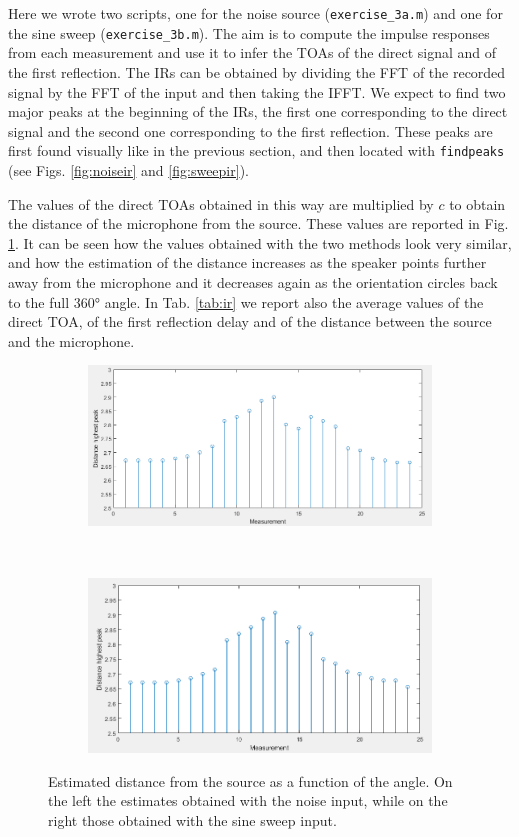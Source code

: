 \documentclass[a4paper]{article}
\begin{document}
Here we wrote two scripts, one for the noise source (\verb|exercise_3a.m|) and one for the sine sweep (\verb|exercise_3b.m|). The aim is to compute the impulse responses from each measurement and use it to infer the TOAs of the direct signal and of the first reflection. The IRs can be obtained by dividing the FFT of the recorded signal by the FFT of the input and then taking the IFFT. We expect to find two major peaks at the beginning of the IRs, the first one corresponding to the direct signal and the second one corresponding to the first reflection. These peaks are first found visually like in the previous section, and then located with \verb|findpeaks| (see Figs. \ref{fig:noiseir} and \ref{fig:sweepir}).

The values of the direct TOAs obtained in this way are multiplied by $c$ to obtain the distance of the microphone from the source. These values are reported in Fig. \ref{fig:distance}.  It can be seen how the values obtained with the two methods look very similar, and how the estimation of the distance increases as the speaker points further away from the microphone and it decreases again as the orientation circles back to the full 360° angle. In Tab. \ref{tab:ir} we report also the average values of the direct TOA, of the first reflection delay and of the distance between the source and the microphone.

\begin{figure}[h]
	\centering
	\begin{subfigure}{0.47\linewidth}
		\centering
		\includegraphics[width=0.9\linewidth]{noise_distance.png}
	\end{subfigure}
	~
	\begin{subfigure}{0.47\linewidth}
		\centering
		\includegraphics[width=0.9\linewidth]{sweep_distance.png}
	\end{subfigure}
	\caption{Estimated distance from the source as a function of the angle. On the left the estimates obtained with the noise input, while on the right those obtained with the sine sweep input.}
	\label{fig:distance}
\end{figure}
\end{document}
